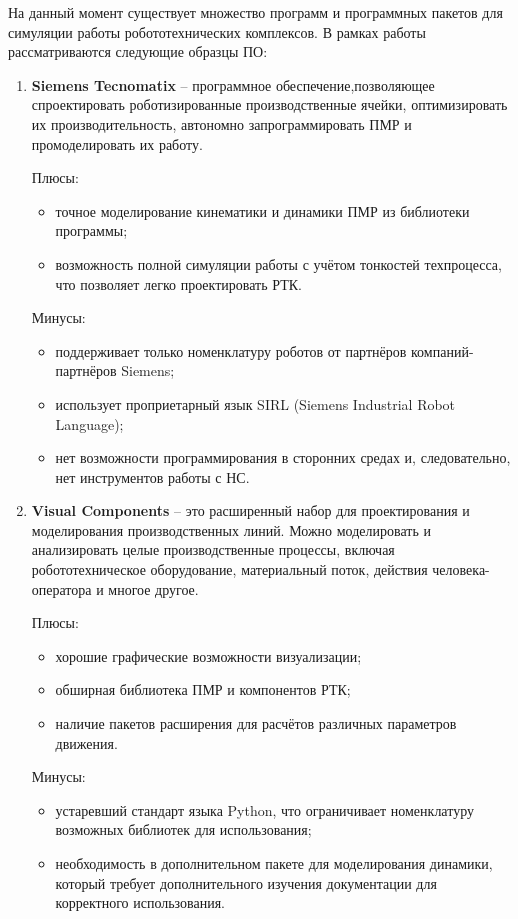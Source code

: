 На данный момент существует множество программ и программных пакетов для симуляции работы робототехнических комплексов. В рамках работы рассматриваются следующие образцы ПО:
\begin{enumerate}
    \item \textbf{Siemens Tecnomatix} \cite{soft_Siemens} -- программное обеспечение,позволяющее спроектировать роботизированные производственные ячейки, оптимизировать их производительность, автономно запрограммировать ПМР и промоделировать их работу.

    Плюсы:
    \begin{itemize}
        \item точное моделирование кинематики и динамики ПМР из библиотеки программы;
        \item возможность полной симуляции работы с учётом тонкостей техпроцесса, что позволяет легко проектировать РТК.
    \end{itemize}

    Минусы:
    \begin{itemize}
        \item поддерживает только номенклатуру роботов от партнёров компаний-партнёров Siemens;
        \item использует проприетарный язык SIRL (Siemens Industrial Robot Language);
        \item нет возможности программирования в сторонних средах и, следовательно, нет инструментов работы с НС.
    \end{itemize}
    
    \item \textbf{Visual Components} \cite{soft_Visual_Comp} -- это расширенный набор для проектирования и моделирования производственных линий. Можно моделировать и анализировать целые производственные процессы, включая робототехническое оборудование, материальный поток, действия человека-оператора и многое другое.

    Плюсы:
    \begin{itemize}
        \item хорошие графические возможности визуализации;
        \item обширная библиотека ПМР и компонентов РТК;        
        \item наличие пакетов расширения для расчётов различных параметров движения.
    \end{itemize}

    Минусы:
    \begin{itemize}
        \item устаревший стандарт языка Python, что ограничивает номенклатуру возможных библиотек для использования;
        \item необходимость в дополнительном пакете для моделирования динамики, который требует дополнительного изучения документации для корректного использования.
    \end{itemize}
    

\end{enumerate}
